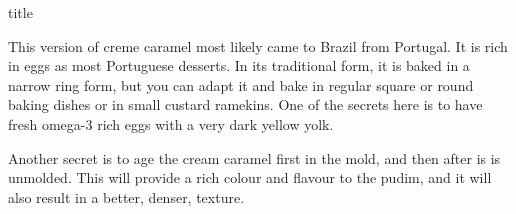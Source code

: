 \documentclass [11pt, letterpaper] {article}
\begin{document}
 {title}


\vspace{0.4 in}
This version of creme caramel most likely came to Brazil from
Portugal. It is rich in eggs as most Portuguese desserts. In its
traditional form, it is baked in a narrow ring form, but you can adapt
it and bake in regular square or round baking dishes or in small
custard ramekins. One of the secrets here is to have fresh omega-3  rich eggs with a very dark yellow yolk.

Another secret is to age the cream caramel first in the mold, and then after is is unmolded. This will provide a rich colour and flavour to the pudim, and it will also result in a better, denser, texture.

\vspace{0.3in}
\end{document}

